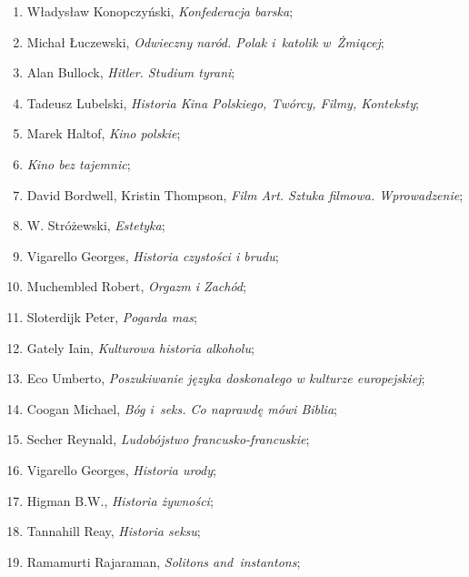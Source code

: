 \documentclass[a4paper,11pt]{article}
\begin{document}
\begin{enumerate}
\item Władysław Konopczyński, \textit{Konfederacja barska};

\item Michał Łuczewski, \textit{Odwieczny naród. Polak i~katolik
    w~Żmiącej};

\item Alan Bullock, \textit{Hitler. Studium tyrani};

\item Tadeusz Lubelski, \textit{Historia Kina Polskiego, Twórcy, Filmy,
    Konteksty};

\item Marek Haltof, \textit{Kino polskie};

\item \textit{Kino bez tajemnic};

\item David Bordwell, Kristin Thompson, \textit{Film Art. Sztuka
    filmowa. Wprowadzenie};

\item W. Stróżewski, \textit{Estetyka};

\item Vigarello Georges, \textit{Historia czystości i brudu};

\item Muchembled Robert, \textit{Orgazm i Zachód};

\item Sloterdijk Peter, \textit{Pogarda mas};

\item Gately Iain, \textit{Kulturowa historia alkoholu};

\item Eco Umberto, \textit{Poszukiwanie języka doskonałego w kulturze
    europejskiej};

\item Coogan Michael, \textit{Bóg i~seks. Co naprawdę mówi Biblia};

\item Secher Reynald, \textit{Ludobójstwo francusko-francuskie};

\item Vigarello Georges, \textit{Historia urody};

\item Higman B.W., \textit{Historia żywności};

\item Tannahill Reay, \textit{Historia seksu};

\item Ramamurti Rajaraman, \textit{Solitons and~instantons};


\end{enumerate}
\end{document}
